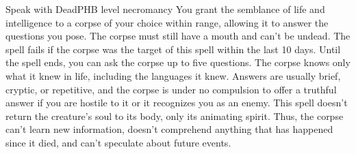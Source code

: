 \begin{spell}{Speak with Dead}{PHB}{ level necromancy}
{
}
You grant the semblance of life and intelligence to a
corpse of your choice within range, allowing it to answer
the questions you pose. The corpse must still have a mouth
and can't be undead. The spell fails if the corpse was the
target of this spell within the last 10 days. Until the
spell ends, you can ask the corpse up to five questions.
The corpse knows only what it knew in life, including the
languages it knew. Answers are usually brief, cryptic, or
repetitive, and the corpse is under no compulsion to offer
a truthful answer if you are hostile to it or it recognizes
you as an enemy. This spell doesn't return the creature's
soul to its body, only its animating spirit. Thus, the
corpse can't learn new information, doesn't comprehend
anything that has happened since it died, and can't
speculate about future events.
\end{spell}
